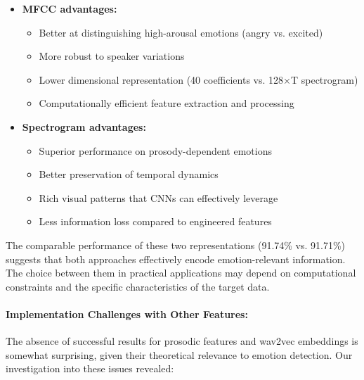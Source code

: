 \documentclass[12pt]{article}
\begin{document}
\begin{itemize}
    \item \textbf{MFCC advantages:}
    \begin{itemize}
        \item Better at distinguishing high-arousal emotions (angry vs. excited)
        \item More robust to speaker variations
        \item Lower dimensional representation (40 coefficients vs. 128×T spectrogram)
        \item Computationally efficient feature extraction and processing
    \end{itemize}
    
    \item \textbf{Spectrogram advantages:}
    \begin{itemize}
        \item Superior performance on prosody-dependent emotions
        \item Better preservation of temporal dynamics
        \item Rich visual patterns that CNNs can effectively leverage
        \item Less information loss compared to engineered features
    \end{itemize}
\end{itemize}

The comparable performance of these two representations (91.74\% vs. 91.71\%) suggests that both approaches effectively encode emotion-relevant information. The choice between them in practical applications may depend on computational constraints and the specific characteristics of the target data.

\paragraph{Implementation Challenges with Other Features:}
The absence of successful results for prosodic features and wav2vec embeddings is somewhat surprising, given their theoretical relevance to emotion detection. Our investigation into these issues revealed:
\end{document}
